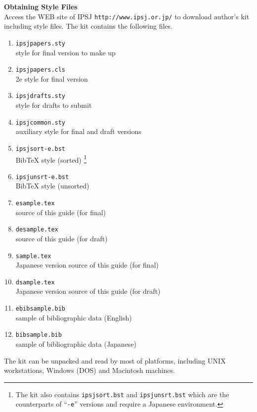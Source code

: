 \documentclass[english]{ipsjpapers}
\def\|{\verb|}
\def\LaTeX{\leavevmode\smash{\iLATEX{\sc a}}}
\def\iLATEX#1{L\kern-.36em\raise.3ex\hbox{#1}\kern-.15em
    T\kern-.1667em\lower.7ex\hbox{E}\kern-.125emX}
\def\LATEXe{\ifx\LaTeXe\undefined \LaTeX 2e\else\LaTeXe\fi}
\begin{document}
\begin{Enumerate}%{
\item {\bf Obtaining Style Files}\\
Access the WEB site of IPSJ \|http://www.|\allowbreak\|ipsj.or.jp/| to
download author's kit including style files.  The kit contains the following
files. 
%
\begin{enumerate}%
\item{\tt ipsjpapers.sty}\mbox{}\\style for final version to make up
\item{\tt ipsjpapers.cls}\mbox{}\\{\LATEXe} style for final version
\item{\tt ipsjdrafts.sty}\mbox{}\\style for drafts to submit
\item{\tt ipsjcommon.sty}\mbox{}\\auxiliary style for final and draft versions
\item{\tt ipsjsort-e.bst}\mbox{}\\Bib{\TeX} style (sorted)%
\footnote[3]{%
The kit also contains \texttt{ipsjsort.bst} and
\texttt{ipsjunsrt.}\allowbreak\texttt{bst} which 
are the counterparts of ``\texttt{-e}'' versions and require a Japanese
\LaTeX{} environment.}
\item{\tt ipsjunsrt-e.bst}\mbox{}\\Bib{\TeX} style (unsorted)%
\footnotemark[3]
\item{\tt esample.tex}\mbox{}\\source of this guide (for final)
\item{\tt desample.tex}\mbox{}\\source of this guide (for draft)
\item{\tt sample.tex}\mbox{}\\Japanese version source of this guide (for final)
\item{\tt dsample.tex}\mbox{}\\Japanese version source of this guide
(for draft)
\item{\tt ebibsample.bib}\mbox{}\\sample of bibliographic data (English)
\item{\tt bibsample.bib}\mbox{}\\sample of bibliographic data (Japanese)
\end{enumerate}%
%
The kit can be unpacked and read by most of platforms, including UNIX
workstations, Windows (DOS) and Macintosh machines.


\end{Enumerate}
\end{document}
